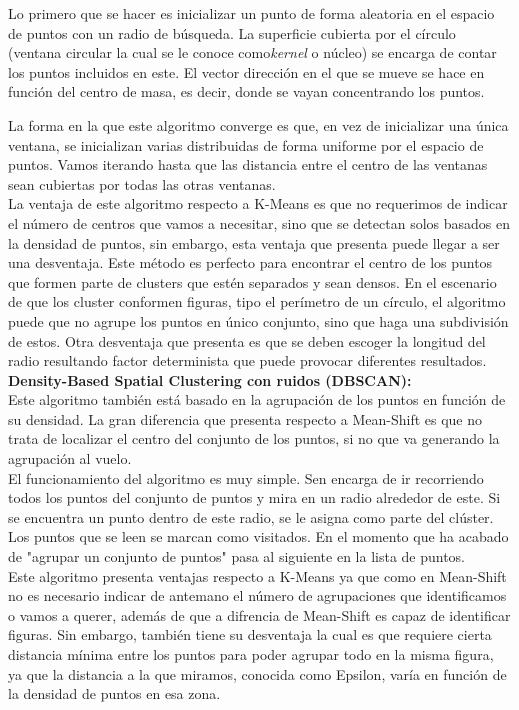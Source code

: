 \documentclass[conference,a4paper]{IEEEtran}
\begin{document}
Lo primero que se hacer es inicializar un punto de forma aleatoria en el espacio de puntos con un radio de búsqueda. La superficie cubierta por el círculo (ventana circular la cual se le conoce como\textit{kernel} o núcleo) se encarga de contar los puntos incluidos en este. El vector dirección en el que se mueve se hace en función del centro de masa, es decir, donde se vayan concentrando los puntos.

La forma en la que este algoritmo converge es que, en vez de inicializar una única ventana, se inicializan varias distribuidas de forma uniforme por el espacio de puntos. Vamos iterando hasta que las distancia entre el centro de las ventanas sean cubiertas por todas las otras ventanas.\\

La ventaja de este algoritmo respecto a K-Means es que no requerimos de indicar el número de centros que vamos a necesitar, sino que se detectan solos basados en la densidad de puntos, sin embargo, esta ventaja que presenta puede llegar a ser una desventaja. Este método es perfecto para encontrar el centro de los puntos que formen parte de clusters que estén separados y sean densos. En el escenario de que los cluster conformen figuras, tipo el perímetro de un círculo, el algoritmo puede que no agrupe los puntos en único conjunto, sino que haga una subdivisión de estos. Otra desventaja que presenta es que se deben escoger la longitud del radio resultando factor determinista que puede provocar diferentes resultados.\\

\textbf{Density-Based Spatial Clustering con ruidos (DBSCAN):}\\

Este algoritmo también está basado en la agrupación de los puntos en función de su densidad. La gran diferencia que presenta respecto a Mean-Shift es que no trata de localizar el centro del conjunto de los puntos, si no que va generando la agrupación al vuelo.\\

El funcionamiento del algoritmo es muy simple. Sen encarga de ir recorriendo todos los puntos del conjunto de puntos y mira en un radio alrededor de este. Si se encuentra un punto dentro de este radio, se le asigna como parte del clúster. Los puntos que se leen se marcan como visitados. En el momento que ha acabado de "agrupar un conjunto de puntos" pasa al siguiente en la lista de puntos.\\

Este algoritmo presenta ventajas respecto a K-Means ya que como en Mean-Shift no es necesario indicar de antemano el número de agrupaciones que identificamos o vamos a querer, además de que a difrencia de Mean-Shift es capaz de identificar figuras. Sin embargo, también tiene su desventaja la cual es que requiere cierta distancia mínima entre los puntos para poder agrupar todo en la misma figura, ya que la distancia a la que miramos, conocida como Epsilon, varía en función de la densidad de puntos en esa zona.\\
\end{document}
